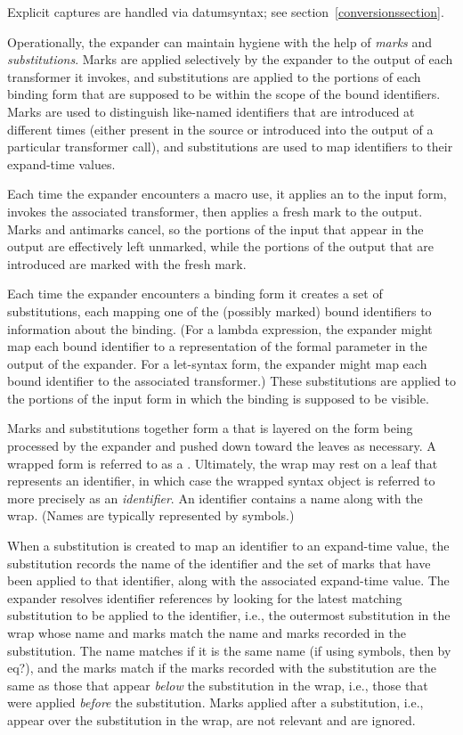 Explicit captures are handled via {\cf datum\coerce{}syntax}; see
section~\ref{conversionssection}.

Operationally, the expander can maintain hygiene with the help of
\emph{marks} and \emph{substitutions}.
Marks are applied selectively by the expander to the output of each
transformer it invokes, and substitutions are applied to the portions
of each binding form that are supposed to be within the scope of the bound
identifiers.
Marks are used to distinguish like-named identifiers that are
introduced at different times (either present in the source or introduced
into the output of a particular transformer call), and substitutions are
used to map identifiers to their expand-time values.

Each time the expander encounters a macro use, it applies an
 to the input form, invokes the associated transformer,
then applies a fresh mark to the output.
Marks and antimarks cancel, so the portions of the input that appear in
the output are effectively left unmarked, while the portions of the output
that are introduced are marked with the fresh mark.

Each time the expander encounters a binding form it creates a set of
substitutions, each mapping one of the (possibly marked) bound identifiers
to information about the binding.
(For a {\cf lambda} expression, the expander might map each bound
identifier to a representation of the formal parameter in the output of
the expander.
For a {\cf let-syntax} form, the expander might map each bound
identifier to the associated transformer.)
These substitutions are applied to the portions of the input form in
which the binding is supposed to be visible.

Marks and substitutions together form a  that is layered on the
form being processed by the expander and pushed down toward the leaves as
necessary.
A wrapped form is referred to as a .
Ultimately, the wrap may rest on a leaf that represents an identifier, in
which case the wrapped syntax object is referred to more precisely
as an \emph{identifier}.
An identifier contains a name along with the wrap.
(Names are typically represented by symbols.)

When a substitution is created to map an identifier to an expand-time
value, the substitution records the name of the identifier and
the set of marks that have been applied to that identifier, along
with the associated expand-time value.
The expander resolves identifier references by looking for the latest
matching substitution to be applied to the identifier, i.e., the outermost
substitution in the wrap whose name and marks match the name and
marks recorded in the substitution.
The name matches if it is the same name (if using symbols, then by
{\cf eq?}), and the marks match if the marks recorded with the
substitution are the same as those that appear \emph{below} the
substitution in the wrap, i.e., those that were applied \emph{before} the
substitution.
Marks applied after a substitution, i.e., appear over the substitution in
the wrap, are not relevant and are ignored.

